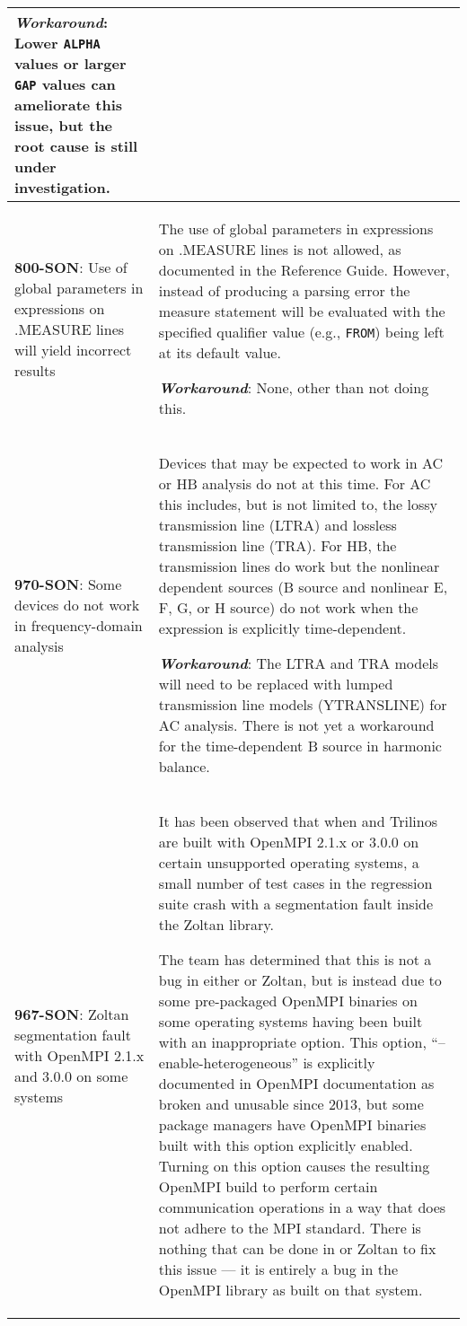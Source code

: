 {\begin{longtable}[h] {>{\raggedright\small}m{2in}|>{\raggedright\let\\\tabularnewline\small}m{3.5in}}
\textbf{\textit{Workaround}}: Lower \texttt{ALPHA} values or larger 
\texttt{GAP} values can ameliorate this issue, but the root cause is 
still under investigation. 
\\ \hline

\textbf{800-SON}: Use of global parameters in expressions on .MEASURE lines
will yield incorrect results & The use of global parameters in expressions
on .MEASURE lines is not allowed, as documented in the \Xyce{} Reference Guide.
However, instead of producing a parsing error the measure statement will be
evaluated with the specified qualifier value (e.g., \texttt{FROM}) being left
at its default value.

\textbf{\textit{Workaround}}: None, other than not doing this.
\\ \hline

\textbf{970-SON}: Some devices do not work in frequency-domain analysis &
Devices that may be expected to work in AC or HB analysis do not at
this time.  For AC this includes, but is not limited to, the lossy
transmission line (LTRA) and lossless transmission line (TRA).  For
HB, the transmission lines do work but the nonlinear dependent sources
(B source and nonlinear E, F, G, or H source) do not work when the
expression is explicitly time-dependent.

\textbf{\textit{Workaround}}: The LTRA and TRA models will need to be replaced
with lumped transmission line models (YTRANSLINE) for AC analysis.
There is not yet a workaround for the time-dependent B source in
harmonic balance.
\\ \hline

\textbf{967-SON}: Zoltan segmentation fault with OpenMPI 2.1.x and 3.0.0 on
some systems &

It has been observed that when \Xyce{} and Trilinos are built with
OpenMPI 2.1.x or 3.0.0 on certain unsupported operating systems, a
small number of test cases in the regression suite crash with a
segmentation fault inside the Zoltan library.

The \Xyce{} team has determined that this is not a bug in
either \Xyce{} or Zoltan, but is instead due to some pre-packaged OpenMPI
binaries on some operating systems having been built with an
inappropriate option.  This option, ``--enable-heterogeneous'' is
explicitly documented in OpenMPI documentation as broken and unusable
since 2013, but some package managers have OpenMPI binaries built with
this option explicitly enabled.  Turning on this option causes the
resulting OpenMPI build to perform certain communication operations in
a way that does not adhere to the MPI standard.  There is nothing that
can be done in \Xyce{} or Zoltan to fix this issue --- it is entirely
a bug in the OpenMPI library as built on that system.


\end{longtable}}
